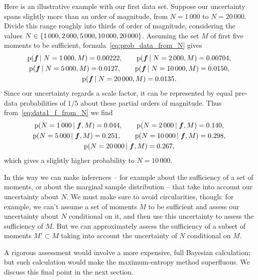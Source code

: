 \documentclass[\ifafour a4paper,12pt,\else a5paper,10pt,\fi%
onecolumn,oneside,article,%
british%
]{memoir}
\theoremstyle{remark}
\theoremstyle{innote}
\DeclarePairedDelimiter\set{\{}{\}}
\newcommand*{\pf}{\mathrm{p}}%
\renewcommand*{\|}{\nonscript\,\vert\nonscript\;\mathopen{}}
\newcommand*{\yff}{f}
\newcommand*{\yf}{\bm{\yff}}
\begin{document}
Here is an illustrative example with our first data set. Suppose our
uncertainty spans slightly more than an order of magnitude, from $N=1\,000$
to $N=20\,000$. Divide this range roughly into thirds of order of
magnitude, considering the values
$N\in \set{1\,000, 2\,000, 5\,000, 10\,000, 20\,000}$. Assuming the set $M$
of first five moments to be sufficient, formula~\eqref{eq:prob_data_from_N}
gives
\begin{equation}
  \label{eq:data1_f_from_N}
  \begin{gathered}
  \pf(\yf \| N=1\,000, M) =  0.00222,\qquad
  \pf(\yf \| N=2\,000, M) =  0.00704,\\
  \pf(\yf \| N=5\,000, M) =  0.0127,\qquad
  \pf(\yf \| N=10\,000, M) =  0.0150,\\
  \pf(\yf \| N=20\,000, M) =  0.0135.
\end{gathered}
\end{equation}
Since our uncertainty regards a scale factor, it can be represented by
equal pre-data probabilities of $1/5$ about these partial orders of
magnitude. Thus from~\eqref{eq:data1_f_from_N} we find
\begin{equation}
  \label{eq:data1_N_from_f}
  \begin{gathered}
  \pf(N=1\,000 \| \yf, M) =  0.044,\qquad
  \pf(N=2\,000 \| \yf, M) =  0.140,\\
  \pf(N=5\,000 \| \yf, M) =  0.251,\qquad
  \pf(N=10\,000 \| \yf, M) =  0.298,\\
  \pf(N=20\,000 \| \yf, M) =  0.267,
\end{gathered}
\end{equation}
which gives a slightly higher probability to $N=10\,000$.

\bigskip

In this way we can make inferences -- for example about the sufficiency of
a set of moments, or about the marginal sample distribution -- that take
into account our uncertainty about $N$. We must make sure to avoid
circularities, though: for example, we can't assume a set of moments $M$ to
be sufficient and assess our uncertainty about $N$ conditional on it, and
then use this uncertainty to assess the sufficiency of $M$. But we can
approximately assess the sufficiency of a subset of moments $M' \subset M$
taking into account the uncertainty of $N$ conditional on $M$.

A rigorous assessment would involve a more expensive, full Bayesian
calculation; but such calculation would make the maximum-entropy
method superfluous. We discuss this final point in the next section.
\end{document}
